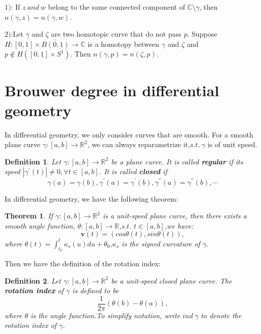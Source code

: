 \documentclass[11pt]{article}
\newtheorem{theorem}{Theorem}
\newtheorem{definition}{Definition}
\numberwithin{equation}{section} \numberwithin{theorem}{section}
\numberwithin{lemma}{section} \numberwithin{remark}{section}
\numberwithin{table}{section} \numberwithin{corollary}{section}
\numberwithin{example}{section} \numberwithin{conjecture}{section}
\numberwithin{assumption}{section}
\numberwithin{definition}{section}
\numberwithin{proposition}{section}
\begin{document}
$\mathbb{\mathit{1}})$: If $z\ and  \ w$ belong to the same connected component of $\mathbb{C} \setminus \gamma$, then $n(\gamma,z)=n(\gamma,w)$.

$\mathbb{\mathit{2}})$:Let $\gamma $ and $\zeta$ are two homotopic curve that do not pass $p$. Suppose $H:[0,1]\times \overline{B(0,1)} \rightarrow \mathbb{C}$  is a homotopy between $\gamma$ and $\zeta$ and $p \notin H([0,1]\times S^1)$.
Then $n(\gamma,p)=n(\zeta,p)$. 

\section{Brouwer degree in differential geometry}
In differential geometry, we only consider curves that are smooth. For a smooth plane curve $\gamma:[a,b]\rightarrow \mathbb{R}^2$, we can always reparametrize it,$s.t.\  \gamma$ is of unit speed.
\begin{definition}
Let $\gamma: [a,b]\rightarrow \mathbb{R}^2 $ be a plane curve. It is called \textbf{regular} if its speed $|\gamma^{'}(t)| \neq 0,\forall t\in [a,b]$. It is called \textbf{closed} if 
\begin{equation}
    \gamma(a)=\gamma(b),\gamma^{'}(a)=\gamma^{'}(b),\gamma^{''}(a)=\gamma^{''}(b),\cdots
    \end{equation}
\end{definition}
In differential geometry, we have the following theorem:
\begin{theorem}\cite[Prop 1.39]{tapp2016differential}
If $\gamma:[a,b]\rightarrow  \mathbb{R}^2$ is a unit-speed plane curve, then there exists a smooth angle function, $\theta:[a,b]\rightarrow \mathbb{R}$,$s.t.$ \forall $t \in [a,b]$,we have:
\begin{equation}
    \mathbf{v}(t)=(cos\theta(t),sin\theta(t)),
\end{equation}
where $\theta (t)=\int_{t_0}^t \kappa _s(u)du+\theta_0$,$\kappa_s$ is the signed curvature of $\gamma$.

\end{theorem}
Then we have the definition of the rotation index:
\begin{definition}
Let $\gamma:[a,b]\rightarrow \mathbb{R}^2$ be a unit-speed clsoed plane curve. The \textbf{rotation index} of $\gamma$ is defined to be 
\begin{equation}
    \frac{1}{2\pi}(\theta(b)-\theta(a)),
\end{equation}
where $\theta$ is the angle function.To simplify notation, write $ind \ \gamma$ to denote the rotation index of $\gamma$.
\end{definition}
\end{document}
